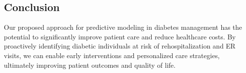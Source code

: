 \documentclass{article}
\begin{document}
\subsection{Conclusion}
Our proposed approach for predictive modeling in diabetes management has the potential to significantly improve patient care and reduce healthcare costs. By proactively identifying diabetic individuals at risk of rehospitalization and ER visits, we can enable early interventions and personalized care strategies, ultimately improving patient outcomes and quality of life.
\end{document}
